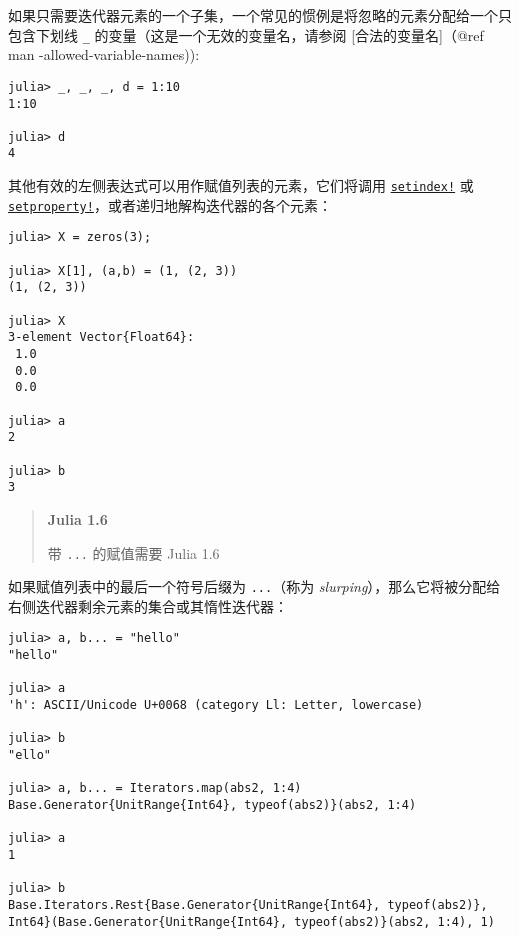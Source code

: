 如果只需要迭代器元素的一个子集，一个常见的惯例是将忽略的元素分配给一个只包含下划线 \texttt{\_} 的变量（这是一个无效的变量名，请参阅 [合法的变量名]（@ref man -allowed-variable-names)):




\begin{verbatim}
julia> _, _, _, d = 1:10
1:10

julia> d
4
\end{verbatim}



其他有效的左侧表达式可以用作赋值列表的元素，它们将调用 \hyperlink{1309244355901386657}{\texttt{setindex!}} 或 \hyperlink{9055518433069578344}{\texttt{setproperty!}}，或者递归地解构迭代器的各个元素：




\begin{verbatim}
julia> X = zeros(3);

julia> X[1], (a,b) = (1, (2, 3))
(1, (2, 3))

julia> X
3-element Vector{Float64}:
 1.0
 0.0
 0.0

julia> a
2

julia> b
3
\end{verbatim}



\begin{quote}
\textbf{Julia 1.6}

带 \texttt{...} 的赋值需要 Julia 1.6

\end{quote}


如果赋值列表中的最后一个符号后缀为 \texttt{...}（称为 \emph{slurping}），那么它将被分配给右侧迭代器剩余元素的集合或其惰性迭代器：




\begin{verbatim}
julia> a, b... = "hello"
"hello"

julia> a
'h': ASCII/Unicode U+0068 (category Ll: Letter, lowercase)

julia> b
"ello"

julia> a, b... = Iterators.map(abs2, 1:4)
Base.Generator{UnitRange{Int64}, typeof(abs2)}(abs2, 1:4)

julia> a
1

julia> b
Base.Iterators.Rest{Base.Generator{UnitRange{Int64}, typeof(abs2)}, Int64}(Base.Generator{UnitRange{Int64}, typeof(abs2)}(abs2, 1:4), 1)
\end{verbatim}



